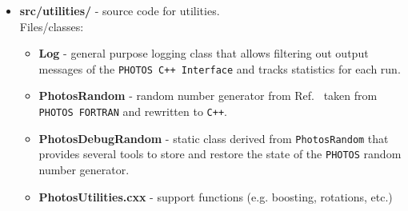 \documentclass[]{Photos_interface_design}
\begin{document}
\begin{itemize}
\item {\bf src/utilities/ } - source code for utilities.\\
  Files/classes:
  \begin{itemize}
  \item { \bf Log} - general purpose logging class that allows filtering out output messages 
      of the {\tt PHOTOS {\tt C++} Interface} and tracks statistics for each run.
  \item { \bf PhotosRandom} - random number generator from Ref.~\cite{James:1988vf,marsaglia:1987} taken from {\tt PHOTOS FORTRAN} and rewritten to {\tt C++}.
  \item { \bf PhotosDebugRandom} - static class derived from {\tt PhotosRandom} that provides several tools to store and restore
                                   the state of the {\tt PHOTOS} random number generator.
  \item { \bf PhotosUtilities.cxx} - support functions (e.g. boosting, rotations, etc.)
  \end{itemize}


\end{itemize}
\end{document}
